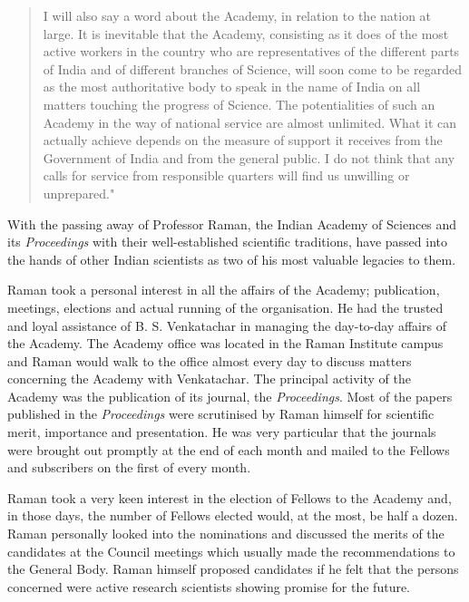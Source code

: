 \begin{quote}
{I will also say a word about the Academy, in relation to the nation at large. It is inevitable that the Academy, consisting as it does of the most active workers in the country who are representatives of the \hbox{different} parts of India and of different branches of Science, will soon come to be regarded as the most authoritative body to speak in the name of India on all matters touching the progress of Science. The potentialities of such an Academy in the way of national service are almost unlimited. What it can actually achieve depends on the measure of support it receives from the Government of India and from the general public. I do not think that any calls for service from responsible quarters will find us unwilling or unprepared."
}\relax
\end{quote}

With the passing away of Professor Raman, the Indian Academy of Sciences and its {\em Proceedings} with their well-establi\-shed scientific traditions, have passed into the hands of other Indian scientists as two of his most valuable legacies to them.

Raman took a personal interest in all the affairs of the Academy; publication, meetings, elections and actual running of the organisation. He had the trusted and loyal assistance of B. S. Venkatachar in managing the day-to-day affairs of the Academy. The Academy office was located in the Raman Institute campus and Raman would walk to the office almost every day to discuss matters concerning the Academy with Venkatachar. The principal activity of the Academy was the publication of its journal, the {\em Proceedings}. Most of the papers published in the {\em Proceedings} were scrutinised by Raman himself for scientific merit, importance and presentation. He was very particular that the journals were brought out promptly at the end of each month and mailed to the Fellows and subscribers on the first of every month.

Raman took a very keen interest in the election of Fellows to the Academy and, in those days, the number of Fellows elected would, at the most, be half a dozen. Raman personally looked into the nominations and discussed the merits of the candidates at the Council meetings which usually made the recommendations to the General Body. Raman himself proposed candidates if he felt that the persons concerned were active research scientists showing promise for the future. 

\newpage


